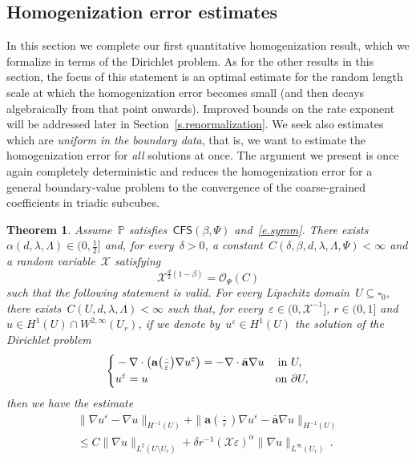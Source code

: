 \documentclass[11pt]{article} %
\let\oldsquare\square %
\renewcommand{\square}{\oldsquare}
\numberwithin{equation}{section}
\newtheorem{theorem}{Theorem}[section]
\theoremstyle{definition}
\let\originalleft\left
\let\originalright\right
\renewcommand{\left}{\mathopen{}\mathclose\bgroup\originalleft}
\renewcommand{\right}{\aftergroup\egroup\originalright}
\newcommand{\eps}{\varepsilon}
\newcommand{\ep}{\eps}
\renewcommand{\a}{\mathbf{a}}
\newcommand{\ahom}{\bar{\a}}
\newcommand{\cu}{\square}
\renewcommand{\P}{\mathbb{P}}
\newcommand{\X}{\mathcal{X}}
\renewcommand{\O}{\mathcal{O}}
\newcommand{\CFS}{\mathsf{CFS}}
\begin{document}
\subsection{Homogenization error estimates}
\label{ss.det}


In this section we complete our first quantitative homogenization result, which we formalize in terms of the Dirichlet problem. 
As for the other results in this section, the focus of this statement is an optimal estimate for the random length scale at which the homogenization error becomes small (and then decays algebraically from that point onwards).
Improved bounds on the rate exponent will be addressed later in Section~\ref{s.renormalization}. 
We seek also estimates which are \emph{uniform in the boundary data}, that is, we want to estimate the homogenization error for \emph{all} solutions at once. The argument we present is once again completely deterministic and reduces the homogenization error for a general boundary-value problem to the convergence of the coarse-grained coefficients in triadic subcubes. 



\begin{theorem}
\label{t.quant.DP}
Assume~$\P$ satisfies~$\CFS(\beta,\Psi)$ and~\eqref{e.symm}. 
There exists~$\alpha(d,\lambda,\Lambda) \in (0,\tfrac12]$ and, for every~$\delta>0$, a constant~$C(\delta,\beta,d,\lambda,\Lambda,\Psi)<\infty$ and a random variable~$\X$ satisfying 
\begin{equation}
\label{e.mmmbound1}
\X^{\frac d2 (1-\beta)}
= \O_\Psi(C)
\end{equation}
such that the following statement is valid. 
For every Lipschitz domain~$U\subseteq \cu_0$, 
there exists~$C(U,d,\lambda,\Lambda)<\infty$ such that, for every~$\ep \in (0,\X^{-1} ]$, $r \in (0,1]$ and~$u\in H^1(U) \cap W^{2,\infty}(U_r)$,
 if we denote by~$u^\ep\in H^1(U)$ the solution of the Dirichlet problem
\begin{equation*}
\left\{
\begin{aligned}
& -\nabla \cdot \left( \a\left(\tfrac \cdot\ep\right) \nabla u^\ep \right) = -\nabla \cdot \ahom \nabla u &  \mbox{in} & \ U, \\
& u^\ep = u & \mbox{on} & \ \partial U,
\end{aligned}
\right.
\end{equation*}
then we have the estimate
\begin{multline}
\label{e.quant.DP}
\| \nabla u^\ep - \nabla u \|_{H^{-1}(U)} 
+ 
\| \a(\tfrac \cdot \ep) \nabla u^\ep - \ahom \nabla u \|_{H^{-1}(U)} 
\\ 
\leq
C \| \nabla u \|_{{L}^2(U \setminus U_r)} 
+ 
\delta r^{-1} 
(\X \ep)^\alpha 
\| \nabla u \|_{L^\infty(U_r)} 
\,.
\end{multline}
\end{theorem}
\end{document}
